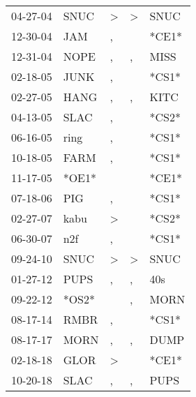 \begin{supertabular}{lllll}
 04-27-04 &   SNUC &  \textgreater &  \textgreater &   SNUC \\
 12-30-04 &    JAM &             , &               &  *CE1* \\
 12-31-04 &   NOPE &             , &             , &   MISS \\
 02-18-05 &   JUNK &             , &               &  *CS1* \\
 02-27-05 &   HANG &             , &             , &   KITC \\
 04-13-05 &   SLAC &             , &               &  *CS2* \\
 06-16-05 &   ring &             , &               &  *CS1* \\
 10-18-05 &   FARM &             , &               &  *CS1* \\
 11-17-05 &  *OE1* &               &               &  *CE1* \\
 07-18-06 &    PIG &             , &               &  *CS1* \\
 02-27-07 &   kabu &  \textgreater &               &  *CS2* \\
 06-30-07 &    n2f &             , &               &  *CS1* \\
 09-24-10 &   SNUC &  \textgreater &  \textgreater &   SNUC \\
 01-27-12 &   PUPS &             , &             , &    40s \\
 09-22-12 &  *OS2* &               &             , &   MORN \\
 08-17-14 &   RMBR &             , &               &  *CS1* \\
 08-17-17 &   MORN &             , &             , &   DUMP \\
 02-18-18 &   GLOR &  \textgreater &               &  *CE1* \\
 10-20-18 &   SLAC &             , &             , &   PUPS \\
\end{supertabular}
